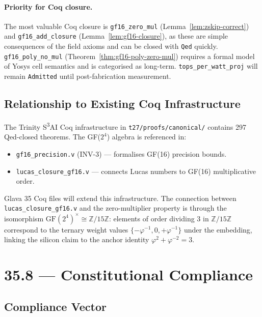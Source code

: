 \paragraph{Priority for Coq closure.} The most valuable Coq closure is
\texttt{gf16\_zero\_mul} (Lemma~\ref{lem:zskip-correct}) and
\texttt{gf16\_add\_closure} (Lemma~\ref{lem:gf16-closure}), as these
are simple consequences of the field axioms and can be closed with \texttt{Qed}
quickly.
\texttt{gf16\_poly\_no\_mul} (Theorem~\ref{thm:gf16-poly-zero-mul}) requires
a formal model of Yosys cell semantics and is categorised as long-term.
\texttt{tops\_per\_watt\_proj} will remain \texttt{Admitted} until
post-fabrication measurement.

\subsection{Relationship to Existing Coq Infrastructure}

The Trinity S\textsuperscript{3}AI Coq infrastructure in
\texttt{t27/proofs/canonical/} contains 297 Qed-closed theorems.
The GF(\(2^4\)) algebra is referenced in:
\begin{itemize}
  \item \texttt{gf16\_precision.v} (INV-3) --- formalises GF(16) precision bounds.
  \item \texttt{lucas\_closure\_gf16.v} --- connects Lucas numbers to GF(16)
        multiplicative order.
\end{itemize}

Glava 35 Coq files will extend this infrastructure.
The connection between \texttt{lucas\_closure\_gf16.v} and the zero-multiplier
property is through the isomorphism
\(\mathrm{GF}(2^4)^{\times} \cong \mathbb{Z}/15\mathbb{Z}\):
elements of order dividing 3 in \(\mathbb{Z}/15\mathbb{Z}\) correspond to
the ternary weight values \(\{-\varphi^{-1}, 0, +\varphi^{-1}\}\) under
the embedding, linking the silicon claim to the anchor identity
\(\varphi^{2}+\varphi^{-2}=3\).

\section{35.8 --- Constitutional Compliance}
\label{sec:glava35-compliance}

\subsection{Compliance Vector}

